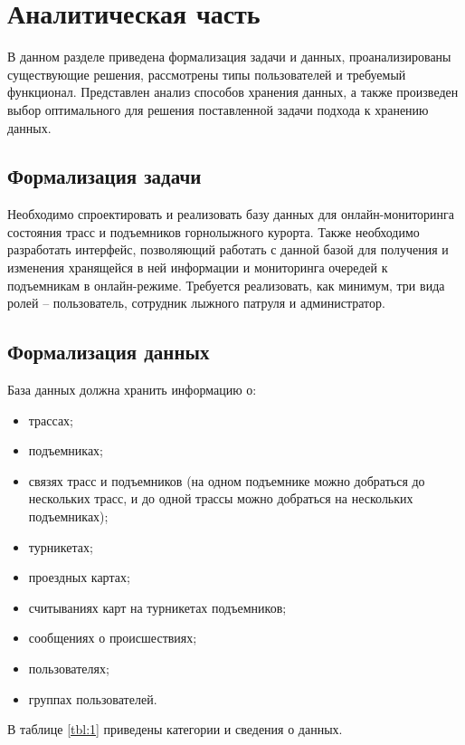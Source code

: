\chapter{Аналитическая часть}

В данном разделе приведена формализация задачи и данных, проанализированы существующие решения, рассмотрены типы пользователей и требуемый функционал.  Представлен анализ способов хранения данных, а также произведен выбор оптимального для решения поставленной задачи подхода к хранению данных. 

\section{Формализация задачи}

Необходимо спроектировать и реализовать базу данных для онлайн-мониторинга состояния трасс и подъемников горнолыжного курорта. Также необходимо разработать интерфейс, позволяющий работать с данной базой для получения и изменения хранящейся в ней информации и мониторинга очередей к подъемникам в онлайн-режиме. Требуется реализовать, как минимум, три вида ролей – пользователь, сотрудник лыжного патруля и администратор.

\section{Формализация данных}\label{data}

База данных должна хранить информацию о:
\begin{itemize}
	\item трассах;
	\item подъемниках;
	\item связях трасс и подъемников (на одном подъемнике можно добраться до нескольких трасс, и до одной трассы можно добраться на нескольких подъемниках);
	\item турникетах;
	\item проездных картах;
	\item считываниях карт на турникетах подъемников;
	\item сообщениях о происшествиях;
	\item пользователях;
	\item группах пользователей.
\end{itemize}

В таблице \ref{tbl:1} приведены категории и сведения о данных.

